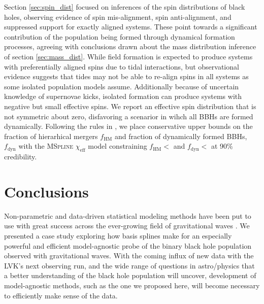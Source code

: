 Section \ref{sec:spin_dist} focused on inferences of the spin distributions of black holes, observing evidence of spin mis-alignment, spin anti-alignment, and suppressed support 
for exactly aligned systems. These point towards a significant contribution of the population being formed through dynamical formation processes, agreeing with 
conclusions drawn about the mass distribution inference of section \ref{sec:mass_dist}. While field formation is expected to produce systems with preferentially 
aligned spins due to tidal interactions, but observational evidence suggests that tides may not be able to re-align spins in all systems as some 
isolated population models assume. Additionally because of uncertain knowledge of supernovae kicks, isolated formation can produce systems with negative but small effective spins. 
We report an effective spin distribution that is not symmetric about zero, disfavoring a scenarior in wihch all BBHs are formed dynamically. Following the rules in \citet{Fishbach_2022}, 
we place conservative upper bounds on the fraction of hierarhical mergers $f_\mathrm{HM}$ and fraction of dynamically formed BBHs, $f_\mathrm{dyn}$ with 
the \textsc{MSpline} $\chi_\mathrm{eff}$ model constraining $f_\mathrm{HM} < $\result{$\macros[ChiEffective][chieff][frac_hm][10th percentile]$} 
and $f_\mathrm{dyn} < $ at 90\% credibility. 

\section{Conclusions}\label{sec:conclusion}

Non-parametric and data-driven statistical modeling methods have been put to use with great success across the ever-growing field of gravitational 
waves \citep{B_Farr_etal_2014,Littenberg_2015,Mandel_2016,Edwards_2018,Doctor_GPR,Edelman_2021,Vitale_2021,Tiwari_2021_a,Tiwari_2021_b,Edelman_2022ApJ,Tiwari_2022ApJ}. 
We presented a case study exploring how basis splines make for an especially powerful and efficient model-agnostic probe of the binary black hole population observed 
with gravitational waves. With the coming influx of new data with the LVK's next observing run, and the wide range of questions in astro/physics that a better 
understanding of the black hole population will uncover, development of model-agnostic methods, such as the one we proposed here, will become necessary to efficiently make
sense of the data.  
